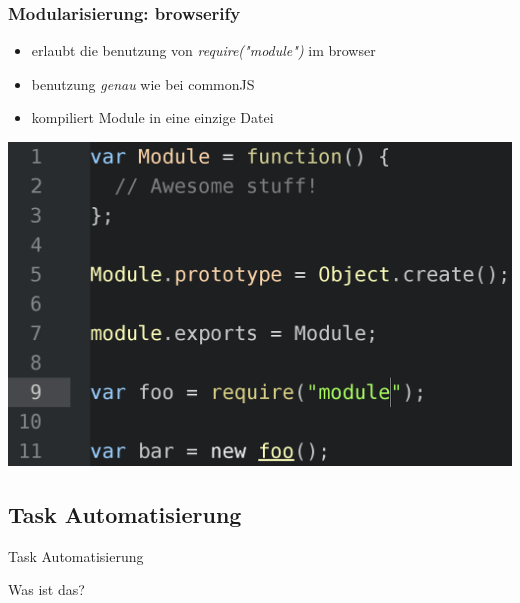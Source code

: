 \documentclass{beamer}
\begin{document}

\begin{frame}
\frametitle{Modularisierung: browserify}
\begin{itemize}
\item erlaubt die benutzung von \textit{require("module")} im browser
\item benutzung \textit{genau} wie bei commonJS
\item kompiliert Module in eine einzige Datei
\end{itemize}
\includegraphics[scale=0.179]{assets/browserify.png}
\end{frame}




\subsection{Task Automatisierung}

\begin{frame}
\Huge{
\centerline{Task Automatisierung}
\centerline{{\small Was ist das?}}
}
\end{frame}

\end{document}
